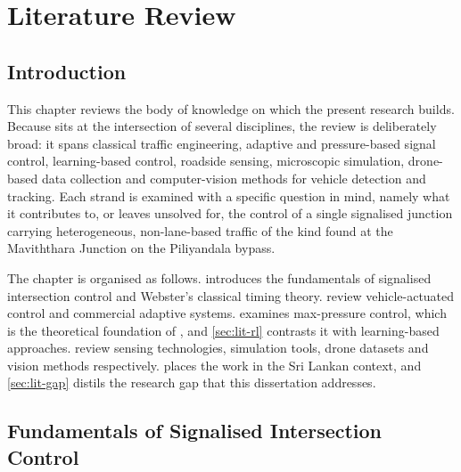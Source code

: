 \chapter{Literature Review}\label{ch:lit}

\section{Introduction}\label{sec:lit-intro}
This chapter reviews the body of knowledge on which the present research builds. Because \prism{} sits at the
intersection of several disciplines, the review is deliberately broad: it spans classical traffic engineering,
adaptive and pressure-based signal control, learning-based control, roadside sensing, microscopic simulation,
drone-based data collection and computer-vision methods for vehicle detection and tracking. Each strand is
examined with a specific question in mind, namely what it contributes to, or leaves unsolved for, the control of
a single signalised junction carrying heterogeneous, non-lane-based traffic of the kind found at the Maviththara
Junction on the Piliyandala bypass.

The chapter is organised as follows.  introduces the fundamentals of signalised
intersection control and Webster's classical timing theory.  review
vehicle-actuated control and commercial adaptive systems.  examines max-pressure
control, which is the theoretical foundation of \prism{}, and \cref{sec:lit-rl} contrasts it with learning-based
approaches.  review sensing technologies, simulation
tools, drone datasets and vision methods respectively.  places the work in the Sri Lankan
context, and \cref{sec:lit-gap} distils the research gap that this dissertation addresses.

\section{Fundamentals of Signalised Intersection Control}\label{sec:lit-fundamentals}
